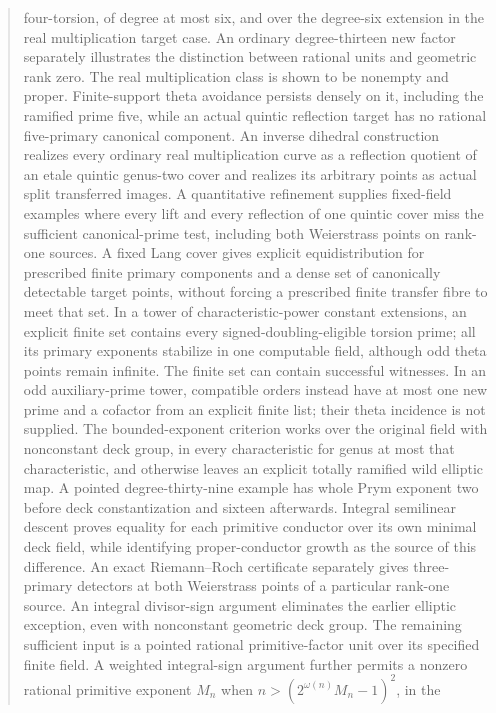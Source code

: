\documentclass[11pt,a4paper]{article}
\begin{document}
\begin{abstract}
four-torsion, of degree at most six, and over the degree-six extension in the
real multiplication target case. An ordinary degree-thirteen new factor
separately illustrates the distinction between rational units and geometric
rank zero. The real multiplication class is shown to be nonempty and proper.
Finite-support theta avoidance persists densely on it, including the
ramified prime five, while an actual quintic reflection target has no
rational five-primary canonical component.
An inverse dihedral construction realizes every ordinary real multiplication
curve as a reflection quotient of an etale quintic genus-two cover and
realizes its arbitrary points as actual split transferred images.
A quantitative refinement supplies fixed-field examples where every
lift and every reflection of one quintic cover miss the sufficient
canonical-prime test, including both Weierstrass points on rank-one
sources. A fixed Lang cover gives explicit equidistribution for prescribed
finite primary components and a dense set of canonically detectable target
points, without forcing a prescribed finite transfer fibre to meet that set.
In a tower of characteristic-power constant extensions, an explicit finite
set contains every signed-doubling-eligible torsion prime; all its primary
exponents stabilize in one computable field, although odd theta points
remain infinite. The finite set can contain successful witnesses. In an odd auxiliary-prime
tower, compatible orders instead have at most one new prime and a cofactor
from an explicit finite list; their theta incidence is not supplied.
The bounded-exponent criterion works over the original field with nonconstant
deck group, in every characteristic for genus at most that characteristic,
and otherwise leaves an explicit totally ramified wild elliptic map.
A pointed degree-thirty-nine example has whole Prym exponent two before
deck constantization and sixteen afterwards. Integral semilinear descent
proves equality for each primitive conductor over its own minimal deck field,
while identifying proper-conductor growth as the source of this difference.
An exact Riemann--Roch certificate separately gives three-primary
detectors at both Weierstrass points of a particular rank-one source.
An integral divisor-sign argument eliminates the earlier elliptic exception,
even with nonconstant geometric deck group. The remaining sufficient input
is a pointed rational primitive-factor unit over its specified finite field.
A weighted integral-sign argument further permits a nonzero rational
primitive exponent $M_n$ when $n>(2^{\omega(n)}M_n-1)^2$, in the

\end{abstract}
\end{document}
